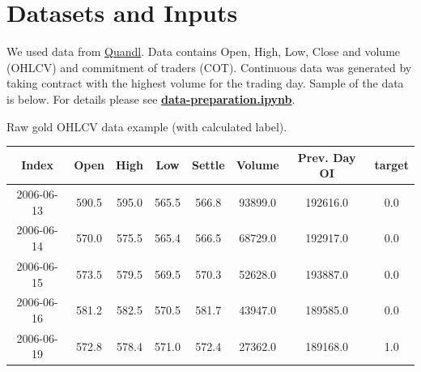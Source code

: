 \documentclass[final,2p]{elsarticle}
\begin{document}
\section{Datasets and Inputs}

We used data from \href{https://www.quandl.com/}{Quandl}. Data contains Open, High, Low, Close and volume (OHLCV) and commitment of traders (COT).
Continuous data was generated by taking contract with the highest volume for the trading day.
Sample of the data is below.
For details please see \href{https://github.com/IzidoroBaltazar/MachineLearningEngineer/blob/master/capstone\_project/data-preparation.ipynb}{\textbf{data-preparation.ipynb}}.

Raw gold OHLCV data example (with calculated label).
\nopagebreak[0]
\begin{center}
    \begin{tabular}{cccccccc}
    Index & Open &High &Low &Settle &Volume &Prev. Day OI &target\\
    \hline
    2006-06-13 &590.5 &595.0 &565.5 &566.8 &93899.0 &192616.0 &0.0\\
    2006-06-14 &570.0 &575.5 &565.4 &566.5 &68729.0 &192917.0 &0.0\\
    2006-06-15 &573.5 &579.5 &569.5 &570.3 &52628.0 &193887.0 &0.0\\
    2006-06-16 &581.2 &582.5 &570.5 &581.7 &43947.0 &189585.0 &0.0\\
    2006-06-19 &572.8 &578.4 &571.0 &572.4 &27362.0 &189168.0 &1.0\\
    \end{tabular}
\end{center}
\end{document}
